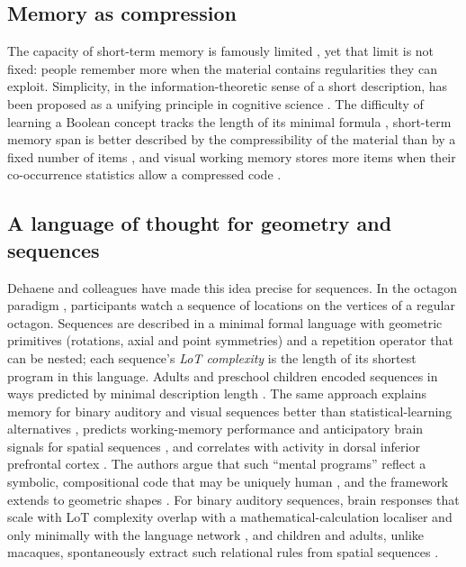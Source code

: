 \documentclass[11pt,a4paper]{article}
\begin{document}
\subsection{Memory as compression}
The capacity of short-term memory is famously limited \citep{miller1956magical,cowan2001magical}, yet that limit is not fixed:
people remember more when the material contains regularities they can exploit. Simplicity, in the information-theoretic sense of
a short description, has been proposed as a unifying principle in cognitive science \citep{chater2003simplicity}. The difficulty of
learning a Boolean concept tracks the length of its minimal formula \citep{feldman2000minimization}, short-term memory span is
better described by the compressibility of the material than by a fixed number of items \citep{mathy2012magic}, and visual working
memory stores more items when their co-occurrence statistics allow a compressed code \citep{brady2009compression}.

\subsection{A language of thought for geometry and sequences}
Dehaene and colleagues have made this idea precise for sequences. In the octagon paradigm \citep{amalric2017language},
participants watch a sequence of locations on the vertices of a regular octagon. Sequences are described in a minimal formal
language with geometric primitives (rotations, axial and point symmetries) and a repetition operator that can be nested; each
sequence's \emph{LoT complexity} is the length of its shortest program in this language. Adults and preschool children
encoded sequences in ways predicted by minimal description length \citep{amalric2017language}. The same approach explains
memory for binary auditory and visual sequences better than statistical-learning alternatives \citep{planton2021theory},
predicts working-memory performance and anticipatory brain signals for spatial sequences \citep{alroumi2021mental}, and
correlates with activity in dorsal inferior prefrontal cortex \citep{wang2019representation}. The authors argue that such
``mental programs'' reflect a symbolic, compositional code that may be uniquely human \citep{dehaene2022symbols}, and the
framework extends to geometric shapes \citep{sablemeyer2022language}. For binary auditory sequences, brain responses
that scale with LoT complexity overlap with a mathematical-calculation localiser and only minimally with the language
network \citep{alroumi2023brain}, and children and adults, unlike macaques, spontaneously extract such relational rules from
spatial sequences \citep{zhang2022working}.
\end{document}

